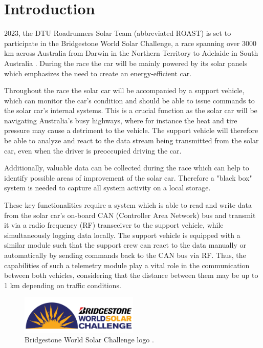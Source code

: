 \documentclass[a4paper,conference]{IEEEtran}
\begin{document}
\section{Introduction}

 2023, the DTU Roadrunners Solar Team (abbreviated ROAST) is set to participate in the Bridgestone World Solar Challenge, a race spanning over 3000 km across Australia from Darwin in the Northern Territory to Adelaide in South Australia \cite{wsc}.
During the race the car will be mainly powered by its solar panels which emphasizes the need to create an energy-efficient car.

Throughout the race the solar car will be accompanied by a support vehicle, which can monitor the car's condition and should be able to issue commands to the solar car's internal systems. This is a crucial function as the solar car will be navigating Australia's busy highways, where for instance the heat and tire pressure may cause a detriment to the vehicle. The support vehicle will therefore be able to analyze and react to the data stream being transmitted from the solar car, even when the driver is preoccupied driving the car. 

Additionally, valuable data can be collected during the race which can help to identify possible areas of improvement of the solar car. Therefore a "black box" system is needed to capture all system activity on a local storage.

These key functionalities require a system which is able to read and write data from the solar car's on-board CAN (Controller Area Network) bus and transmit it via a radio frequency (RF) transceiver to the support vehicle, while simultaneously logging data locally. The support vehicle is equipped with a similar module such that the support crew can react to the data manually or automatically by sending commands back to the CAN bus via RF. Thus, the capabilities of such a telemetry module play a vital role in the communication between both vehicles, considering that the distance between them may be up to 1 km depending on traffic conditions.

\begin{figure}[b]
    \centering
    \includegraphics[width=0.5\textwidth]{documentation/images/SolarChallengeLogo.pdf}
    \caption{Bridgestone World Solar Challenge logo \cite{wsc}.}
    \label{fig:solar}
\end{figure}
\end{document}
